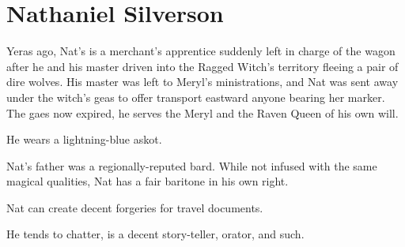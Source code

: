 \section{Nathaniel Silverson}

Yeras ago, Nat's is a merchant's apprentice suddenly left in charge of the wagon after he
  and his master driven into the Ragged Witch's territory fleeing a pair of dire wolves.
His master was left to Meryl's ministrations, and Nat was sent away under the witch's geas to
  offer transport eastward anyone bearing her marker.
The gaes now expired, he serves the Meryl and the Raven Queen of his own will.

He wears a lightning-blue askot.

Nat's father was a regionally-reputed bard.
While not infused with the same magical qualities, Nat has a fair baritone in his own right.

Nat can create decent forgeries for travel documents.

He tends to chatter, is a decent story-teller, orator, and such.

